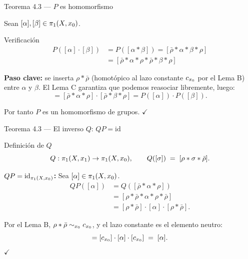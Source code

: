 \begin{frame}{Teorema 4.3 — $P$ es homomorfismo}

  Sean $[\alpha], [\beta] \in \pi_1(X, x_0)$.

  \begin{exampleblock}{Verificación}
    \begin{align*}
      P\!\left([\alpha]\cdot[\beta]\right)
        &= P([\alpha * \beta])
         = [\bar{\rho} * \alpha * \beta * \rho] \\[4pt]
        &= [\bar{\rho} * \alpha * \rho * \bar{\rho} * \beta * \rho]
    \end{align*}
  \end{exampleblock}

  \medskip
  \textbf{Paso clave:} se inserta $\rho * \bar{\rho}$ (homotópico al lazo
  constante $c_{x_0}$ por el Lema B) entre $\alpha$ y $\beta$.
  El Lema C garantiza que podemos reasociar libremente, luego:
  \[
    = [\bar{\rho}*\alpha*\rho]\cdot[\bar{\rho}*\beta*\rho]
    = P([\alpha])\cdot P([\beta]).
  \]

  Por tanto $P$ es un homomorfismo de grupos. \hfill $\checkmark$

\end{frame}

\begin{frame}{Teorema 4.3 — El inverso $Q$: $QP = \mathrm{id}$}

  \begin{block}{Definición de $Q$}
    \[
      Q : \pi_1(X,x_1) \to \pi_1(X,x_0),
      \qquad
      Q([\sigma]) \;=\; [\rho * \sigma * \bar{\rho}].
    \]
  \end{block}

  \medskip
  \textbf{$QP = \mathrm{id}_{\pi_1(X,x_0)}$:} Sea $[\alpha] \in \pi_1(X,x_0)$.
  \begin{align*}
    QP([\alpha])
      &= Q\!\left([\bar{\rho}*\alpha*\rho]\right) \\
      &= [\rho * \bar{\rho} * \alpha * \rho * \bar{\rho}] \\
      &= [\rho*\bar{\rho}] \cdot [\alpha] \cdot [\rho*\bar{\rho}].
  \end{align*}

  Por el Lema B, $\rho * \bar{\rho} \sim_{x_0} c_{x_0}$, y el lazo constante
  es el elemento neutro:
  \[
    = [c_{x_0}] \cdot [\alpha] \cdot [c_{x_0}] \;=\; [\alpha].
  \]
  \hfill $\checkmark$

\end{frame}

